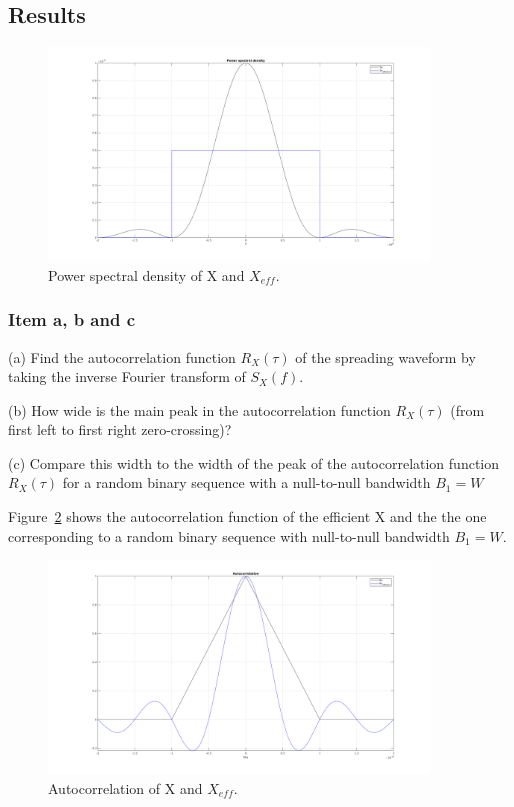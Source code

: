 \subsection{Results}

\begin{figure}[H]
	\centering
	\includegraphics[width=0.9\textwidth]{figs/ex5_psd.png}
	\caption{Power spectral density of X and $X_{eff}$.}
	\label{fig:ex5_psd}
\end{figure}

\subsubsection{Item a, b and c}

(a) Find the autocorrelation function $R_X (\tau )$ of the spreading waveform by
taking the inverse Fourier transform of $S_X (f )$.

(b) How wide is the main peak in the autocorrelation function $R_X (\tau )$
(from first left to first right zero-crossing)?

(c) Compare this width to the width of the peak of the autocorrelation function
$R_X (\tau )$ for a random binary sequence with a null-to-null bandwidth
$B_1 = W$

Figure~\ref{fig:ex5_autocorr} shows the autocorrelation function of the efficient
X and the the one corresponding to a random binary sequence with null-to-null
bandwidth $B_1 = W$.

\begin{figure}[H]
	\centering
	\includegraphics[width=0.9\textwidth]{figs/ex5_autocorr.png}
	\caption{Autocorrelation of X and $X_{eff}$.}
	\label{fig:ex5_autocorr}
\end{figure}


